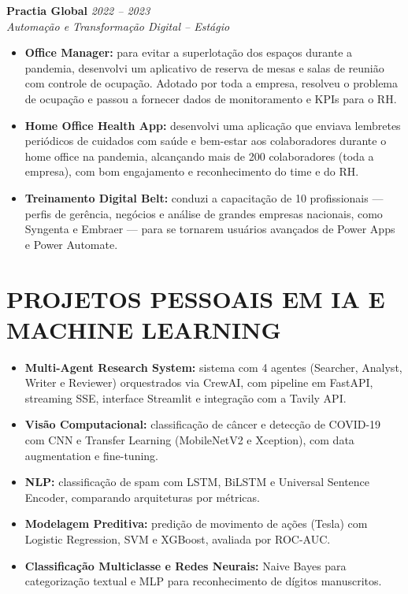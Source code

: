 \documentclass[11pt,a4paper]{article}
\begin{document}
\noindent
\textbf{Practia Global} \hfill \textit{2022 -- 2023} \\
\textit{Automação e Transformação Digital -- Estágio}
\begin{itemize}
    \item \textbf{Office Manager:} para evitar a superlotação dos espaços durante a pandemia, desenvolvi um aplicativo de reserva de mesas e salas de reunião com controle de ocupação. Adotado por toda a empresa, resolveu o problema de ocupação e passou a fornecer dados de monitoramento e KPIs para o RH.
    \item \textbf{Home Office Health App:} desenvolvi uma aplicação que enviava lembretes periódicos de cuidados com saúde e bem-estar aos colaboradores durante o home office na pandemia, alcançando mais de 200 colaboradores (toda a empresa), com bom engajamento e reconhecimento do time e do RH.
    \item \textbf{Treinamento Digital Belt:} conduzi a capacitação de 10 profissionais --- perfis de gerência, negócios e análise de grandes empresas nacionais, como Syngenta e Embraer --- para se tornarem usuários avançados de Power Apps e Power Automate.
\end{itemize}

\section{PROJETOS PESSOAIS EM IA E MACHINE LEARNING}
\begin{itemize}
    \item \textbf{Multi-Agent Research System:} sistema com 4 agentes (Searcher, Analyst, Writer e Reviewer) orquestrados via CrewAI, com pipeline em FastAPI, streaming SSE, interface Streamlit e integração com a Tavily API.
    \item \textbf{Visão Computacional:} classificação de câncer e detecção de COVID-19 com CNN e Transfer Learning (MobileNetV2 e Xception), com data augmentation e fine-tuning.
    \item \textbf{NLP:} classificação de spam com LSTM, BiLSTM e Universal Sentence Encoder, comparando arquiteturas por métricas.
    \item \textbf{Modelagem Preditiva:} predição de movimento de ações (Tesla) com Logistic Regression, SVM e XGBoost, avaliada por ROC-AUC.
    \item \textbf{Classificação Multiclasse e Redes Neurais:} Naive Bayes para categorização textual e MLP para reconhecimento de dígitos manuscritos.
\end{itemize}
\end{document}
